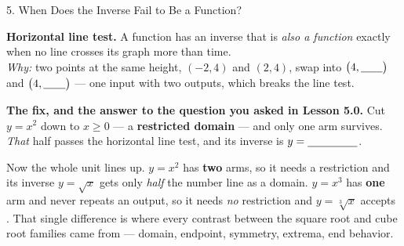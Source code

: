 \documentclass[10pt]{article}
\begin{document}
\begin{notesbox}{5. When Does the Inverse Fail to Be a Function?}
\begin{center}
\begin{minipage}[c]{0.32\linewidth}
\end{minipage}
\end{center}
\vspace{2pt}
\begin{center}
\begin{tcolorbox}[colback=goldbg, colframe=goldacc, boxrule=0.8pt, arc=1.5mm, width=0.94\linewidth,
    left=3mm, right=3mm, top=2mm, bottom=2mm]
\small
\textbf{Horizontal line test.} A function has an inverse that is \emph{also a function} exactly when
no \blank{2.6cm} line crosses its graph more than \blank{1.2cm} time.
\\[3pt]
\emph{Why:} two points at the same height, $(-2,4)$ and $(2,4)$, swap into
$\big(4,\blank{0.7cm}\big)$ and $\big(4,\blank{0.7cm}\big)$ --- one input with two outputs, which
breaks the \blank{2.4cm} line test.
\end{tcolorbox}
\end{center}
\vspace{2pt}
\textbf{The fix, and the answer to the question you asked in Lesson 5.0.} Cut $y=x^{2}$ down to
$x\ge0$ --- a \textbf{restricted domain} --- and only one arm survives. \emph{That} half passes the
horizontal line test, and its inverse is $y=\blank{1.6cm}$.
\begin{center}
\begin{tcolorbox}[colback=forestbg, colframe=forest, boxrule=0.7pt, arc=1.5mm, width=0.94\linewidth,
    left=3mm, right=3mm, top=1.5mm, bottom=1.5mm]
\small
Now the whole unit lines up. $y=x^{2}$ has \textbf{two} arms, so it needs a restriction and its
inverse $y=\sqrt{x}$ gets only \emph{half} the number line as a domain. $y=x^{3}$ has
\textbf{one} arm and never repeats an output, so it needs \emph{no} restriction and
$y=\sqrt[3]{x}$ accepts \blank{2.6cm}. That single difference is where every contrast between the
square root and cube root families came from --- domain, endpoint, symmetry, extrema, end behavior.
\end{tcolorbox}
\end{center}
\end{notesbox}
\end{document}
